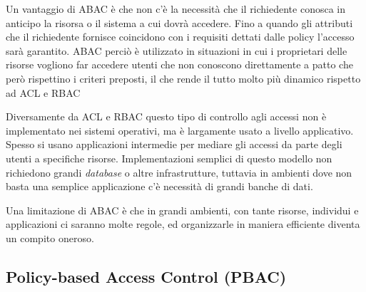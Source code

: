 Un vantaggio di \ac{ABAC} è che non c'è la necessità che il richiedente conosca in anticipo
la risorsa o il sistema a cui dovrà accedere. Fino a quando gli attributi che il richiedente fornisce 
coincidono con i requisiti dettati dalle policy l'accesso sarà garantito. \ac{ABAC} perciò è utilizzato in situazioni in 
cui i proprietari delle risorse vogliono far accedere utenti che non conoscono direttamente a patto che però rispettino i criteri preposti, il che rende il tutto molto più dinamico rispetto ad \ac{ACL} e \ac{RBAC} \par
Diversamente da \ac{ACL} e \ac{RBAC} questo tipo di controllo agli 
accessi non è implementato nei sistemi operativi, ma è largamente usato a livello applicativo.
Spesso si usano applicazioni intermedie per mediare gli accessi da parte degli utenti a specifiche risorse.
Implementazioni semplici di questo modello non richiedono grandi \textit{database} o altre infrastrutture, tuttavia in ambienti dove non basta una semplice applicazione c'è necessità di grandi banche di dati.\par
Una limitazione di \ac{ABAC} è che in grandi ambienti, con tante risorse, individui e applicazioni ci saranno molte regole, ed organizzarle in maniera efficiente diventa un compito oneroso.


\subsection*{Policy-based Access Control (PBAC)} %
\label{sub:policy_based_access_control_}

